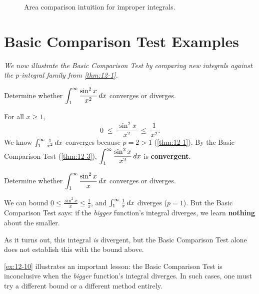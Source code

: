\begin{figure}[ht]
  \centering
  
  \caption{Area comparison intuition for improper integrals.}
  \label{fig:comparison-test-area}
\end{figure}

\section{Basic Comparison Test Examples}
\label{sec:12.8}

\textit{We now illustrate the Basic Comparison Test by comparing new integrals against the $p$-integral family from \cref{thm:12-1}.}

\begin{example}
\label{ex:12-9}
Determine whether $\displaystyle\int_{1}^{\infty}\frac{\sin^{2}x}{x^{2}}\,dx$ converges or diverges.

For all $x\ge 1$,
\[
  0 \;\le\; \frac{\sin^{2}x}{x^{2}} \;\le\; \frac{1}{x^{2}}.
\]
We know $\int_{1}^{\infty}\frac{1}{x^{2}}\,dx$ converges because $p=2>1$ (\cref{thm:12-1}).  By the Basic Comparison Test (\cref{thm:12-3}), $\displaystyle\int_{1}^{\infty}\frac{\sin^{2}x}{x^{2}}\,dx$ is \textbf{convergent}.
\end{example}

\begin{example}
\label{ex:12-10}
Determine whether $\displaystyle\int_{1}^{\infty}\frac{\sin^{2}x}{x}\,dx$ converges or diverges.

We can bound $0\le\frac{\sin^{2}x}{x}\le\frac{1}{x}$, and $\int_{1}^{\infty}\frac{1}{x}\,dx$ diverges ($p=1$).  But the Basic Comparison Test says: if the \emph{bigger} function's integral diverges, we learn \textbf{nothing} about the smaller.

As it turns out, this integral \emph{is} divergent, but the Basic Comparison Test alone does not establish this with the bound above.
\end{example}

\begin{remark}
\cref{ex:12-10} illustrates an important lesson: the Basic Comparison Test is inconclusive when the \emph{bigger} function's integral diverges.  In such cases, one must try a different bound or a different method entirely.
\end{remark}

